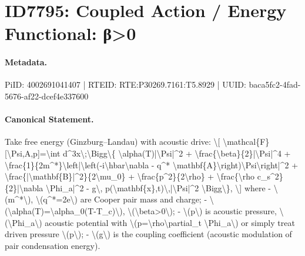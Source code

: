 \section*{ID7795: Coupled Action / Energy Functional: β>0}
\paragraph{Metadata.}
PiID: 4002691041407 | RTEID: RTE:P30269.7161:T5.8929 | UUID: baca5fc2-4fad-5676-af22-dcef4e337600

\paragraph{Canonical Statement.}
Take free energy (Ginzburg–Landau) with acoustic drive: \textbackslash{}[ \textbackslash{}mathcal\{F\}[\textbackslash{}Psi,A,p]=\textbackslash{}int d\textasciicircum{}3x\textbackslash{};\textbackslash{}Bigg\textbackslash{}\{ \textbackslash{}alpha(T)|\textbackslash{}Psi|\textasciicircum{}2 + \textbackslash{}frac\{\textbackslash{}beta\}\{2\}|\textbackslash{}Psi|\textasciicircum{}4 + \textbackslash{}frac\{1\}\{2m\textasciicircum{}*\}\textbackslash{}left|\textbackslash{}left(-i\textbackslash{}hbar\textbackslash{}nabla - q\textasciicircum{}* \textbackslash{}mathbf\{A\}\textbackslash{}right)\textbackslash{}Psi\textbackslash{}right|\textasciicircum{}2 + \textbackslash{}frac\{|\textbackslash{}mathbf\{B\}|\textasciicircum{}2\}\{2\textbackslash{}mu\_0\} + \textbackslash{}frac\{p\textasciicircum{}2\}\{2\textbackslash{}rho\} + \textbackslash{}frac\{\textbackslash{}rho c\_s\textasciicircum{}2\}\{2\}|\textbackslash{}nabla \textbackslash{}Phi\_a|\textasciicircum{}2 - g\textbackslash{}, p(\textbackslash{}mathbf\{x\},t)\textbackslash{},|\textbackslash{}Psi|\textasciicircum{}2 \textbackslash{}Bigg\textbackslash{}\}, \textbackslash{}] where - \textbackslash{}(m\textasciicircum{}*\textbackslash{}), \textbackslash{}(q\textasciicircum{}*=2e\textbackslash{}) are Cooper pair mass and charge; - \textbackslash{}(\textbackslash{}alpha(T)=\textbackslash{}alpha\_0(T-T\_c)\textbackslash{}), \textbackslash{}(\textbackslash{}beta>0\textbackslash{}); - \textbackslash{}(p\textbackslash{}) is acoustic pressure, \textbackslash{}(\textbackslash{}Phi\_a\textbackslash{}) acoustic potential with \textbackslash{}(p=\textbackslash{}rho\textbackslash{}partial\_t \textbackslash{}Phi\_a\textbackslash{}) or simply treat driven pressure \textbackslash{}(p\textbackslash{}); - \textbackslash{}(g\textbackslash{}) is the coupling coefficient (acoustic modulation of pair condensation energy).

